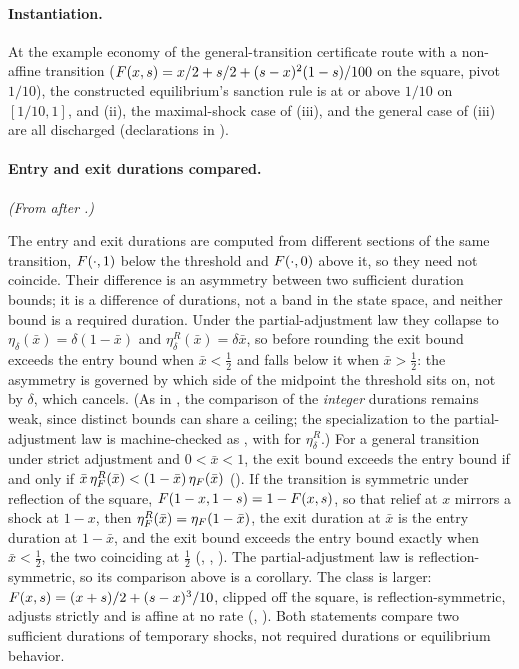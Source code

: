 \paragraph{Instantiation.} At the example economy of the
general-transition certificate route with a non-affine transition
($F(x,s)=x/2+s/2+(s-x)^2(1-s)/100$ on the square, pivot $1/10$), the
constructed equilibrium's sanction rule is at or above $1/10$ on
$[1/10,1]$, and (ii), the maximal-shock case of (iii), and the general
case of (iii) are all discharged (declarations in ).

\paragraph{Entry and exit durations compared.} \emph{(From after .)}

The entry
and exit durations are computed from different sections of the same
transition, $F(\cdot,1)$ below the threshold and $F(\cdot,0)$ above
it, so they need not coincide. Their difference is an asymmetry between
two sufficient duration bounds; it is a difference of durations, not a band
in the state space, and neither bound is a required duration. Under the
partial-adjustment law they collapse to
$\eta_\delta(\bar x)=\delta(1-\bar x)$ and $\eta^{R}_\delta(\bar x)=\delta\bar x$,
so before rounding the exit bound exceeds the entry bound when $\bar x<\tfrac12$
and falls below it when $\bar x>\tfrac12$: the asymmetry is governed by which
side of the midpoint the threshold sits on, not by $\delta$, which cancels. (As
in , the comparison of the \emph{integer}
durations remains weak, since distinct bounds can share a ceiling; the
specialization to the partial-adjustment law is machine-checked as ,
with  for $\eta^{R}_\delta$.) For a general
transition under strict adjustment and $0<\bar x<1$, the exit bound exceeds the
entry bound if and only if
$\bar x\,\eta^{R}_{F}(\bar x)<(1-\bar x)\,\eta_{F}(\bar x)$
(). If the transition is symmetric under
reflection of the square, $F(1-x,1-s)=1-F(x,s)$, so that relief at $x$ mirrors
a shock at $1-x$, then $\eta^{R}_{F}(\bar x)=\eta_{F}(1-\bar x)$, the exit duration
at $\bar x$ is the entry duration at $1-\bar x$, and the exit bound exceeds the
entry bound exactly when $\bar x<\tfrac12$, the two coinciding at $\tfrac12$
(, ,
). The partial-adjustment law is reflection-symmetric,
so its comparison above is a corollary. The class is larger:
$F(x,s)=(x+s)/2+(s-x)^3/10$, clipped off the square, is reflection-symmetric,
adjusts strictly and is affine at no rate (,
). Both statements compare two
sufficient durations of temporary shocks, not required durations or equilibrium
behavior.


